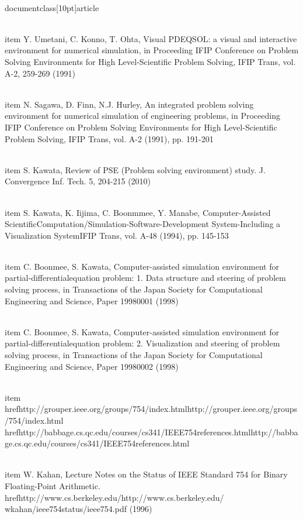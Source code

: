 \\documentclass[10pt]{article}
\begin{document}
  \\item Y. Umetani, C. Konno, T. Ohta, Visual PDEQSOL: a visual and interactive environment for numerical simulation, in Proceeding IFIP Conference on Problem Solving Environments for High Level-Scientific Problem Solving, IFIP Trans, vol. A-2, 259-269 (1991)

  \\item N. Sagawa, D. Finn, N.J. Hurley, An integrated problem solving environment for numerical simulation of engineering problems, in Proceeding IFIP Conference on Problem Solving Environments for High Level-Scientific Problem Solving, IFIP Trans, vol. A-2 (1991), pp. 191-201

  \\item S. Kawata, Review of PSE (Problem solving environment) study. J. Convergence Inf. Tech. 5, 204-215 (2010)

  \\item S. Kawata, K. Iijima, C. Boonmmee, Y. Manabe, Computer-Assisted ScientificComputation/Simulation-Software-Development System-Including a Visualization SystemIFIP Trans, vol. A-48 (1994), pp. 145-153

  \\item C. Boonmee, S. Kawata, Computer-assisted simulation environment for partial-differentialequation problem: 1. Data structure and steering of problem solving process, in Transactions of the Japan Society for Computational Engineering and Science, Paper 19980001 (1998)

  \\item C. Boonmee, S. Kawata, Computer-assisted simulation environment for partial-differentialequation problem: 2. Visualization and steering of problem solving process, in Transactions of the Japan Society for Computational Engineering and Science, Paper 19980002 (1998)

  \\item \\href{http://grouper.ieee.org/groups/754/index.html}{http://grouper.ieee.org/groups/754/index.html} \\href{http://babbage.cs.qc.edu/courses/cs341/IEEE754references.html}{http://babbage.cs.qc.edu/courses/cs341/IEEE754references.html}

  \\item W. Kahan, Lecture Notes on the Status of IEEE Standard 754 for Binary Floating-Point Arithmetic. \\href{http://www.cs.berkeley.edu/}{http://www.cs.berkeley.edu/} wkahan/ieee754status/ieee754.pdf (1996)
\end{document}
